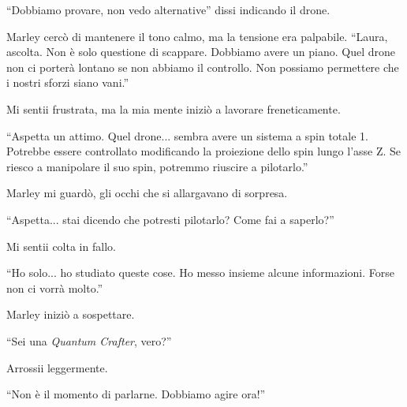 \begin{dialogue}
 \enquote{Dobbiamo provare, non vedo alternative} dissi indicando il drone.
\end{dialogue}

\begin{dialogue}
 Marley cercò di mantenere il tono calmo, ma la tensione era palpabile. \enquote{Laura, ascolta. Non è solo questione di scappare. Dobbiamo avere un piano. Quel drone non ci porterà lontano se non abbiamo il controllo. Non possiamo permettere che i nostri sforzi siano vani.}
\end{dialogue}

Mi sentii frustrata, ma la mia mente iniziò a lavorare freneticamente.

\begin{dialogue}
 \enquote{Aspetta un attimo. Quel drone... sembra avere un sistema a spin totale 1. Potrebbe essere controllato modificando la proiezione dello spin lungo l'asse Z. Se riesco a manipolare il suo spin, potremmo riuscire a pilotarlo.}
\end{dialogue}

Marley mi guardò, gli occhi che si allargavano di sorpresa.

\begin{dialogue}
 \enquote{Aspetta... stai dicendo che potresti pilotarlo? Come fai a saperlo?}
\end{dialogue}

Mi sentii colta in fallo.

\begin{dialogue}
 \enquote{Ho solo... ho studiato queste cose. Ho messo insieme alcune informazioni. Forse non ci vorrà molto.}
\end{dialogue}

Marley iniziò a sospettare.

\begin{dialogue}
 \enquote{Sei una \textit{Quantum Crafter}, vero?}
\end{dialogue}

Arrossii leggermente.

\begin{dialogue}
 \enquote{Non è il momento di parlarne. Dobbiamo agire ora!}
\end{dialogue}

